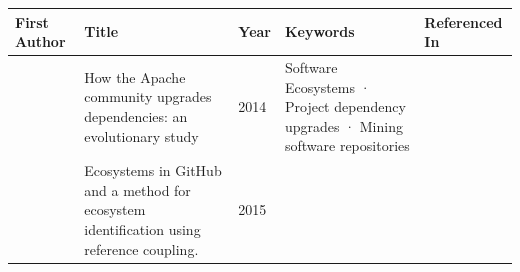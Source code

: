 \documentclass[]{book}
\begin{document}
\begin{longtable}[]{@{}lllll@{}}
\toprule
\begin{minipage}[b]{0.12\columnwidth}\raggedright\strut
First Author\strut
\end{minipage} & \begin{minipage}[b]{0.31\columnwidth}\raggedright\strut
Title\strut
\end{minipage} & \begin{minipage}[b]{0.02\columnwidth}\raggedright\strut
Year\strut
\end{minipage} & \begin{minipage}[b]{0.24\columnwidth}\raggedright\strut
Keywords\strut
\end{minipage} & \begin{minipage}[b]{0.16\columnwidth}\raggedright\strut
Referenced In\strut
\end{minipage}\tabularnewline
\midrule
\endhead
\begin{minipage}[t]{0.12\columnwidth}\raggedright\strut
\citet{Bavota2014}\strut
\end{minipage} & \begin{minipage}[t]{0.31\columnwidth}\raggedright\strut
How the Apache community upgrades dependencies: an evolutionary
study\strut
\end{minipage} & \begin{minipage}[t]{0.02\columnwidth}\raggedright\strut
2014\strut
\end{minipage} & \begin{minipage}[t]{0.24\columnwidth}\raggedright\strut
Software Ecosystems · Project dependency upgrades · Mining software
repositories\strut
\end{minipage} & \begin{minipage}[t]{0.16\columnwidth}\raggedright\strut
\citet{Kula2017}\strut
\end{minipage}\tabularnewline
\begin{minipage}[t]{0.12\columnwidth}\raggedright\strut
\citet{Blincoe2015}\strut
\end{minipage} & \begin{minipage}[t]{0.31\columnwidth}\raggedright\strut
Ecosystems in GitHub and a method for ecosystem identification using
reference coupling.\strut
\end{minipage} & \begin{minipage}[t]{0.02\columnwidth}\raggedright\strut
2015\strut
\end{minipage} & \begin{minipage}[t]{0.24\columnwidth}\raggedright\strut

\end{minipage}
\end{longtable}
\end{document}
